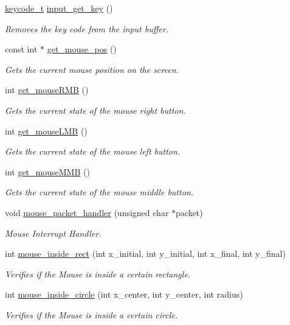 \begin{DoxyCompactItemize}
\hyperlink{group___input_ga6e68664bf6d0e0a4dac76a07ae630c52}{keycode\+\_\+t} \hyperlink{group___input_ga4abaa84a7ae0505c6acab391f82ab1ac}{input\+\_\+get\+\_\+key} ()
\begin{DoxyCompactList}\small\item\em Remove\textquotesingle{}s the key code from the input buffer. \end{DoxyCompactList}\item 
const int $\ast$ \hyperlink{group___input_ga6ee316c978397c6807556fb9298ce902}{get\+\_\+mouse\+\_\+pos} ()
\begin{DoxyCompactList}\small\item\em Gets the current mouse position on the screen. \end{DoxyCompactList}\item 
int \hyperlink{group___input_ga5d6fc0beedad492333795ddff18c20b9}{get\+\_\+mouse\+R\+MB} ()
\begin{DoxyCompactList}\small\item\em Gets the current state of the mouse right button. \end{DoxyCompactList}\item 
int \hyperlink{group___input_gafff0cd01210126d49120f40045cafccc}{get\+\_\+mouse\+L\+MB} ()
\begin{DoxyCompactList}\small\item\em Gets the current state of the mouse left button. \end{DoxyCompactList}\item 
int \hyperlink{group___input_ga38c8f84d3704d46011eee4fd423abaa2}{get\+\_\+mouse\+M\+MB} ()
\begin{DoxyCompactList}\small\item\em Gets the current state of the mouse middle button. \end{DoxyCompactList}\item 
void \hyperlink{group___input_gaeeb5745202c4e6c62abee86ad62f36f6}{mouse\+\_\+packet\+\_\+handler} (unsigned char $\ast$packet)
\begin{DoxyCompactList}\small\item\em Mouse Interrupt Handler. \end{DoxyCompactList}\item 
int \hyperlink{group___input_gaa1aaa6e96c3e2c48378faaace6138b99}{mouse\+\_\+inside\+\_\+rect} (int x\+\_\+initial, int y\+\_\+initial, int x\+\_\+final, int y\+\_\+final)
\begin{DoxyCompactList}\small\item\em Verifies if the Mouse is inside a certain rectangle. \end{DoxyCompactList}\item 
int \hyperlink{group___input_ga287741f65ec2e6257111210ed16d3d05}{mouse\+\_\+inside\+\_\+circle} (int x\+\_\+center, int y\+\_\+center, int radius)
\begin{DoxyCompactList}\small\item\em Verifies if the Mouse is inside a certain circle. \end{DoxyCompactList}\end{DoxyCompactItemize}


